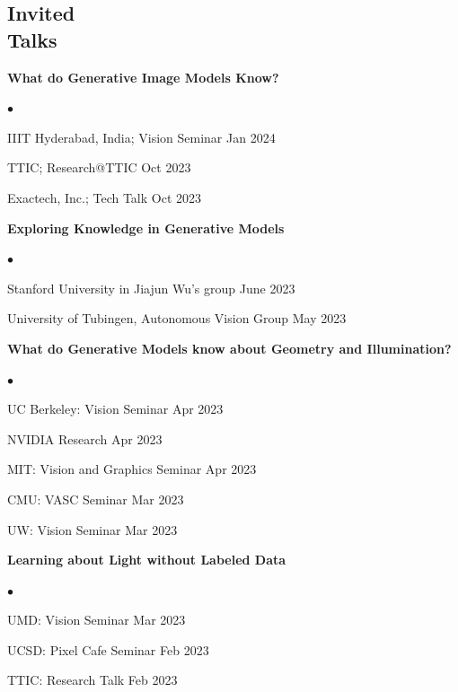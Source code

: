\documentclass[margin,line]{res}
\newenvironment{list2}{
  \begin{list}{$\bullet$}{%
      \setlength{\itemsep}{0in}
      \setlength{\parsep}{0in} \setlength{\parskip}{0in}
      \setlength{\topsep}{0in} \setlength{\partopsep}{0in} 
      \setlength{\leftmargin}{0.2in}}}{\end{list}}
\begin{document}
\begin{resume}
\section{\sc \large Invited \\ Talks}
{\bf What do Generative Image Models Know?}\vspace*{-0.15in}\\
\begin{list2}
\item IIIT Hyderabad, India; Vision Seminar \hfill Jan 2024
\item TTIC; Research@TTIC \hfill Oct 2023
\item Exactech, Inc.; Tech Talk \hfill Oct 2023
\end{list2}
{\bf Exploring Knowledge in Generative Models}\vspace*{-0.15in}\\
\begin{list2}
\item Stanford University in Jiajun Wu's group \hfill June 2023
\item University of Tubingen, Autonomous Vision Group \hfill May 2023
\end{list2}
{\bf What do Generative Models know about Geometry and Illumination?}\vspace*{-0.15in}\\
\begin{list2}
\item UC Berkeley: Vision Seminar \hfill Apr 2023
\item NVIDIA Research \hfill Apr 2023
\item MIT: Vision and Graphics Seminar \hfill Apr 2023
\item CMU: VASC Seminar \hfill Mar 2023
\item UW: Vision Seminar \hfill Mar 2023
\end{list2}
{\bf Learning about Light without Labeled Data}\vspace*{-0.15in}\\
\begin{list2}
\item UMD: Vision Seminar \hfill Mar 2023
\item UCSD: Pixel Cafe Seminar \hfill Feb 2023
\item TTIC: Research Talk \hfill Feb 2023
\end{list2}


\end{resume}
\end{document}
